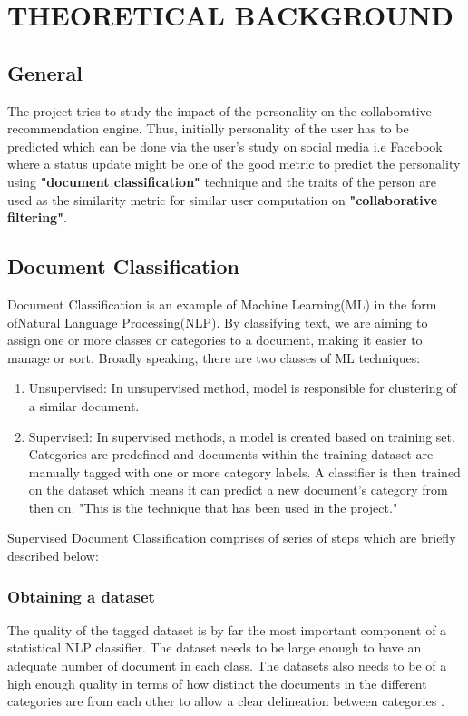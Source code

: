 \newpage
\section{THEORETICAL BACKGROUND}
\subsection{General}
The project tries to study the impact of the personality on the collaborative recommendation engine. Thus, initially personality of the user has to be predicted which can be done via the user's study on social media i.e Facebook where a status update might be one of the good metric to predict the personality using \textbf{"document classification"} technique and the traits of the person are used as the similarity metric for similar user computation on \textbf{"collaborative filtering"}.

\subsection{Document Classification}
Document Classification is an example of Machine Learning(ML) in the form ofNatural Language Processing(NLP). By classifying text, we are aiming to assign one or more classes or categories to a document, making it easier to manage or sort.
Broadly speaking, there are two classes of ML techniques:
\begin{enumerate}
\item Unsupervised: In unsupervised method, model is responsible for clustering of a similar document.
\item Supervised: In supervised methods, a model is created based on training set. Categories are predefined and documents within the training dataset are manually tagged with one or more category labels. A classifier is then trained on the dataset which means it can predict a new document's category from then on. "This is the technique that has been used in the project."
\end{enumerate}

Supervised Document Classification comprises of series of steps which are briefly described below:
\subsubsection{Obtaining a dataset}
The quality of the tagged dataset is by far the most important component of a statistical NLP classifier. The dataset needs to be large enough to have an adequate number of document in each class. The datasets also needs to be of a high enough quality in terms of how distinct the documents in the different categories are from each other to allow a clear delineation between categories \cite{kd}.

